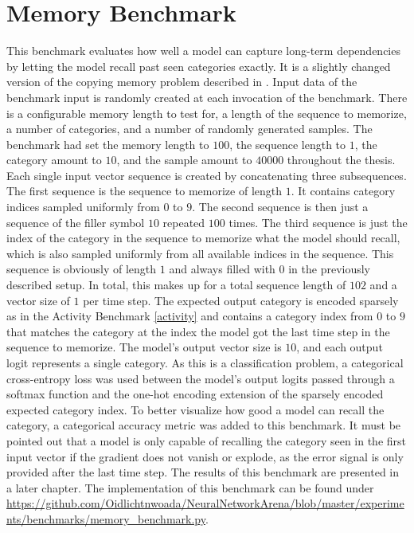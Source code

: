 \documentclass[draft,final]{vutinfth} %
\begin{document}
    \section{Memory Benchmark} \label{memory}
    This benchmark evaluates how well a model can capture long-term dependencies by letting the model recall past seen categories exactly.
    It is a slightly changed version of the copying memory problem described in \cite{UnitaryRNNs}.
    Input data of the benchmark input is randomly created at each invocation of the benchmark.
    There is a configurable memory length to test for, a length of the sequence to memorize, a number of categories, and a number of randomly generated samples.
    The benchmark had set the memory length to $100$, the sequence length to $1$, the category amount to $10$, and the sample amount to $40000$ throughout the thesis.
    Each single input vector sequence is created by concatenating three subsequences.
    The first sequence is the sequence to memorize of length $1$.
    It contains category indices sampled uniformly from $0$ to $9$.
    The second sequence is then just a sequence of the filler symbol $10$ repeated $100$ times.
    The third sequence is just the index of the category in the sequence to memorize what the model should recall, which is also sampled uniformly from all available indices in the sequence.
    This sequence is obviously of length $1$ and always filled with $0$ in the previously described setup.
    In total, this makes up for a total sequence length of $102$ and a vector size of $1$ per time step.
    The expected output category is encoded sparsely as in the Activity Benchmark \ref{activity} and contains a category index from $0$ to $9$ that matches the category at the index the model got the last time step in the sequence to memorize.
    The model's output vector size is $10$, and each output logit represents a single category.
    As this is a classification problem, a categorical cross-entropy loss was used between the model's output logits passed through a softmax function and the one-hot encoding extension of the sparsely encoded expected category index.
    To better visualize how good a model can recall the category, a categorical accuracy metric was added to this benchmark.
    It must be pointed out that a model is only capable of recalling the category seen in the first input vector if the gradient does not vanish or explode, as the error signal is only provided after the last time step.
    The results of this benchmark are presented in a later chapter.
    The implementation of this benchmark can be found under \url{https://github.com/Oidlichtnwoada/NeuralNetworkArena/blob/master/experiments/benchmarks/memory_benchmark.py}.
\end{document}
